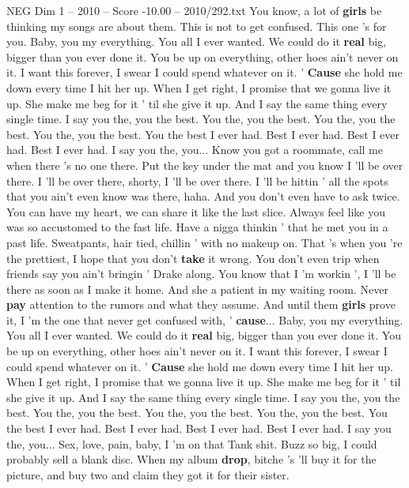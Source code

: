 \begin{textsample}{NEG Dim 1 – 2010 – Score -10.00 – 2010/292.txt}  \label{ex:f1_neg_026}
You know, a lot of \textbf{girls} be thinking my songs are about them.
This is not to get confused.
This one 's for you.
Baby, you my everything.
You all I ever wanted.
We could do it \textbf{real} big, bigger than you ever done it.
You be up on everything, other hoes ain't never on it.
I want this forever, I swear I could spend whatever on it. ' \textbf{Cause} she hold me down every time I hit her up.
When I get right, I promise that we gonna live it up.
She make me beg for it ' til she give it up.
And I say the same thing every single time.
I say you the, you the best.
You the, you the best.
You the, you the best.
You the, you the best.
You the best I ever had.
Best I ever had.
Best I ever had.
Best I ever had.
I say you the, you...
Know you got a roommate, call me when there 's no one there.
Put the key under the mat and you know I 'll be over there.
I 'll be over there, shorty, I 'll be over there.
I 'll be hittin ' all the spots that you ain't even know was there, haha.
And you don't even have to ask twice.
You can have my heart, we can share it like the last slice.
Always feel like you was so accustomed to the fast life.
Have a nigga thinkin ' that he met you in a past life.
Sweatpants, hair tied, chillin ' with no makeup on.
That 's when you 're the prettiest, I hope that you don't \textbf{take} it wrong.
You don't even trip when friends say you ain't bringin ' Drake along.
You know that I 'm workin ', I 'll be there as soon as I make it home.
And she a patient in my waiting room.
Never \textbf{pay} attention to the rumors and what they assume.
And until them \textbf{girls} prove it, I 'm the one that never get confused with, ' \textbf{cause}...
Baby, you my everything.
You all I ever wanted.
We could do it \textbf{real} big, bigger than you ever done it.
You be up on everything, other hoes ain't never on it.
I want this forever, I swear I could spend whatever on it. ' \textbf{Cause} she hold me down every time I hit her up.
When I get right, I promise that we gonna live it up.
She make me beg for it ' til she give it up.
And I say the same thing every single time.
I say you the, you the best.
You the, you the best.
You the, you the best.
You the, you the best.
You the best I ever had.
Best I ever had.
Best I ever had.
Best I ever had.
I say you the, you...
Sex, love, pain, baby, I 'm on that Tank shit.
Buzz so big, I could probably sell a blank disc.
When my album \textbf{drop}, bitche 's 'll buy it for the picture, and buy two and claim they got it for their sister.

\end{textsample}
